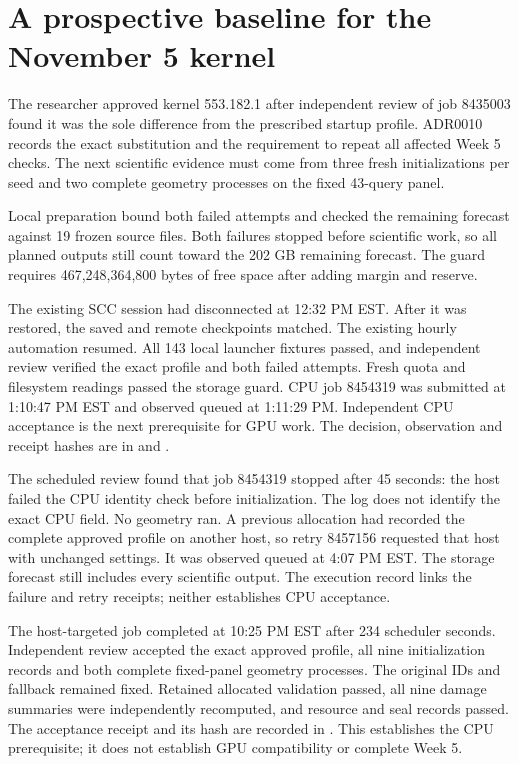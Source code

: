 \section{A prospective baseline for the November 5 kernel}

The researcher approved kernel 553.182.1 after independent review of job 8435003
found it was the sole difference from the prescribed startup profile. ADR0010
records the exact substitution and the requirement to repeat all affected Week 5
checks. The next scientific evidence must come from three fresh initializations
per seed and two complete geometry processes on the fixed 43-query panel.

Local preparation bound both failed attempts and checked the remaining forecast
against 19 frozen source files. Both failures stopped before scientific work, so
all planned outputs still count toward the 202 GB remaining forecast. The guard
requires 467,248,364,800 bytes of free space after adding margin and reserve.

The existing SCC session had disconnected at 12:32 PM EST. After it was
restored, the saved and remote checkpoints matched. The existing hourly
automation resumed. All 143 local launcher fixtures passed, and independent
review verified the exact profile and both failed attempts. Fresh quota and
filesystem readings passed the storage guard. CPU job 8454319 was submitted at
1:10:47 PM EST and observed queued at 1:11:29 PM. Independent CPU acceptance
is the next prerequisite for GPU work. The decision, observation and receipt
hashes are in  and
.

The scheduled review found that job 8454319 stopped after 45 seconds: the host
failed the CPU identity check before initialization. The log does not identify
the exact CPU field. No geometry ran. A previous allocation had recorded the
complete approved profile on another host, so retry 8457156 requested that host
with unchanged settings. It was observed queued at 4:07 PM EST. The storage
forecast still includes every scientific output. The execution record links
the failure and retry receipts; neither establishes CPU acceptance.


The host-targeted job completed at 10:25 PM EST after 234 scheduler seconds.
Independent review accepted the exact approved profile, all nine initialization
records and both complete fixed-panel geometry processes. The original IDs and
fallback remained fixed. Retained allocated validation passed, all nine damage
summaries were independently recomputed, and resource and seal records passed.
The acceptance receipt and its hash are recorded in
. This establishes the CPU prerequisite;
it does not establish GPU compatibility or complete Week 5.


